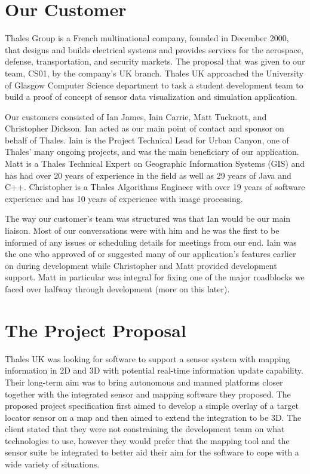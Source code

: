 \documentclass{l3proj}
\begin{document}
\section{Our Customer}

Thales Group is a French multinational company, founded in December 2000, that designs and builds electrical systems and provides services for the aerospace, defense, transportation, and security markets.\cite{thales} The proposal that was given to our team, CS01, by the company’s UK branch. Thales UK approached the University of Glasgow Computer Science department to task a student development team to build a proof of concept of sensor data visualization and simulation application.

Our customers consisted of Ian James, Iain Carrie, Matt Tucknott, and Christopher Dickson. Ian acted as our main point of contact and sponsor on behalf of Thales. Iain is the Project Technical Lead for Urban Canyon, one of Thales’ many ongoing projects, and was the main beneficiary of our application. Matt is a Thales Technical Expert on Geographic Information Systems (GIS)  and has had over 20 years of experience in the field as well as 29 years of Java and C++. Christopher is a Thales Algorithms Engineer with over 19 years of software experience and has 10 years of experience with image processing.

The way our customer’s team was structured was that Ian would be our main liaison. Most of our conversations were with him and he was the first to be informed of any issues or scheduling details for meetings from our end. Iain was the one who approved of or suggested many of our application’s features earlier on during development while Christopher and Matt provided development support. Matt in particular was integral for fixing one of the major roadblocks we faced over halfway through development (more on this later). 

\section{The Project Proposal}

Thales UK was looking for software to support a sensor system with mapping information in 2D and 3D with potential real-time information update capability. Their long-term aim was to bring autonomous and manned platforms closer together with the integrated sensor and mapping software they proposed. The proposed project specification first aimed to develop a simple overlay of a target locator sensor on a map and then aimed to extend the integration to be 3D. The client stated that they were not constraining the development team on what technologies to use, however they would prefer that the mapping tool and the sensor suite be integrated to better aid their aim for the software to cope with a wide variety of situations.
\end{document}

